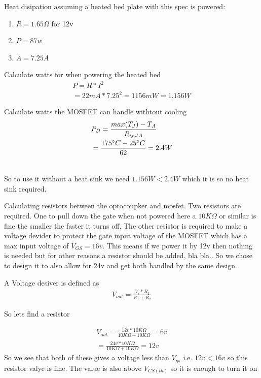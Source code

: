 \documentclass{article}
\begin{document}
Heat disipation assuming a heated bed plate with this spec is powered:
\begin{enumerate}
	\item $R = 1.65\Omega$ for 12v
	\item $P = 87 w$
	\item $A=7.25A$
\end{enumerate}

Calculate watts for when powering the heated bed
\begin{equation}
 \begin{multlined}
P = R*I^2\\
 = 22mA*7.25^2 = 1156mW = 1.156W
\end{multlined}
\end{equation}

Calculate watts the MOSFET can handle withtout cooling
\begin{equation}
 \begin{multlined}
P_D = \frac{max(T_J)-T_A}{R_{øJA}}\\
= \frac{175\degree{}C-25\degree{}C}{62} = 2.4 W\\
\end{multlined}
\end{equation}

So to use it without a heat sink we need $1.156W < 2.4W$ which it is so no heat sink required.

Calculating resistors between the optocoupker and mosfet. Two resistors are required. One to pull down the gate when not powered here a $10K\Omega$ or similar is fine the smaller the faster it turns off. The other resistor is required to make a voltage devider to protect the gate input voltage of the MOSFET which has a max input voltage of $V_{GS} = 16v$. This means if we power it by 12v then nothing is needed but for other reasons a resistor should be added, bla bla.. So we chose to design it to also allow for 24v and get both handled by the same design.

A Voltage desiver is defined as
 \begin{equation}
 \begin{multlined}
V_{out} = \frac{V_s * R_2}{R_1+R_2}
\end{multlined}
\end{equation}

So lets find a resistor

 \begin{equation}
 \begin{multlined}
V_{out} = \frac{12v * 10K\Omega}{10K\Omega+10K\Omega} = 6v \\
 = \frac{24v * 10K\Omega}{10K\Omega+10K\Omega} = 12v 
\end{multlined}
\end{equation}
So we see that both of these gives a voltage less than $V_{gs}$ i.e. $12v < 16v$ so this resistor valye is fine. The value is also above $V_{CS(th)}$ so it is enough to turn it on
\end{document}
